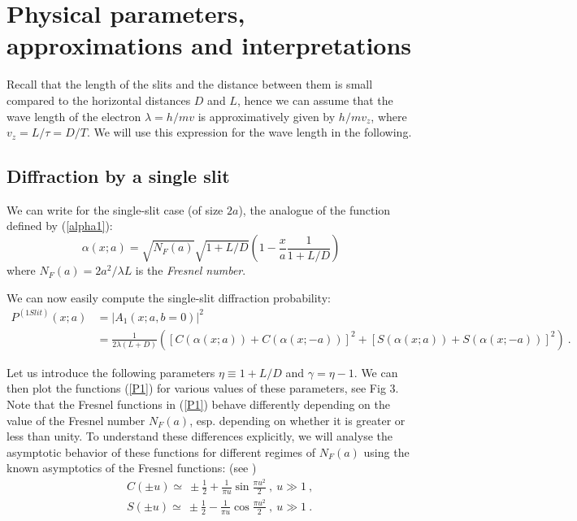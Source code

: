 \documentclass[12pt]{article}   %
\begin{document}
\section{Physical parameters, approximations and interpretations}

Recall that the length of the slits and the distance between them
is small compared to the horizontal distances $D$ and $L$, hence we can
assume that the wave length of the electron $\lambda=h/mv$ 
is approximatively given by $h/mv_z$, where $v_z=L/\tau=D/T$. 
We will use this expression for the wave length in the following.

\subsection{Diffraction by a single slit}

We can write for the single-slit case (of size $2a$), the
analogue of the function defined by (\ref{alpha1}):
\begin{equation}\label{alpha}
\alpha(x;a)=\sqrt{N_F(a)}\sqrt{1+L/D}
\left(1-\frac{x}{a}\frac{1}{1+L/D}\right)
\end{equation}
where $N_F(a)=2a^2/\lambda L$ is the \textit{Fresnel number}.

We can now easily compute the single-slit diffraction
probability:
\begin{align}\label{P1}
P^{(1Slit)}(x;a) &= |A_1(x;a,b=0)|^2
{}\nonumber\\{}&=\frac{1}{2\lambda(L+D)} \left([C(\alpha(x;a)) +
C(\alpha(x;-a))]^2 + [S(\alpha(x;a)) + S(\alpha(x;-a))]^2 \right)\ .
\end{align}

Let us introduce the following parameters $\eta\equiv 1+L/D$ and
$\gamma=\eta-1$. We can then plot the functions (\ref{P1}) for
various values of these parameters, see Fig 3. Note that the
Fresnel functions in (\ref{P1}) behave differently depending on
the value of the Fresnel number $N_F(a)$, esp. depending on
whether it is greater or less than unity. To understand these
differences explicitly, we will analyse the asymptotic behavior
of these functions for different regimes of $N_F(a)$ using the
known asymptotics of the Fresnel functions: (see \cite{Abramowitz})
\begin{eqnarray}\label{ApproxCS}
&& C(\pm u)\simeq\ \pm\frac{1}{2}+\frac{1}{\pi u}\sin{\frac{\pi
u^2}{2}}\ ,\ u\gg1\ , {}\nonumber\\{}&& S(\pm u)\simeq\
\pm\frac{1}{2}-\frac{1}{\pi u}\cos{\frac{\pi u^2}{2}}\ ,\ u\gg1\ .
\end{eqnarray}
\end{document}
